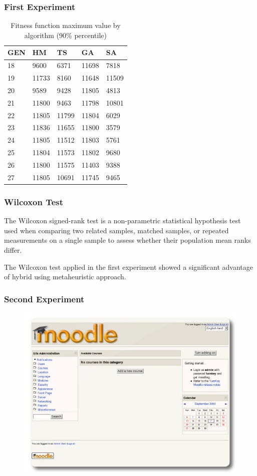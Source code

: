\documentclass{beamer}
\begin{document}
\begin{frame}[allowframebreaks]
\frametitle{First Experiment}
\begin{table}[h]
\centering
\caption{Fitness function maximum value by algorithm (90\% percentile)}
\label{tab:averagefirst}
\begin{tabular}{|l|l|l|l|l|}
\hline
GEN & HM & TS  & GA    & SA    \\ \hline
18         & 9600  & 6371          & 11698 & 7818  \\ \hline
19         & 11733 & 8160          & 11648 & 11509 \\ \hline
20         & 9589  & 9428          & 11805 & 4813  \\ \hline
21         & 11800 & 9463          & 11798 & 10801 \\ \hline
22         & 11805 & 11799         & 11804 & 6029  \\ \hline
23         & 11836 & 11655         & 11800 & 3579  \\ \hline
24         & 11805 & 11512         & 11803 & 5761  \\ \hline
25         & 11804 & 11573         & 11802 & 9680  \\ \hline
26         & 11800 & 11575         & 11403 & 9388  \\ \hline
27         & 11805 & 10691         & 11745 & 9465  \\ \hline
\end{tabular}
\end{table}
\end{frame}


\begin{frame}
\frametitle{Wilcoxon Test}
The Wilcoxon signed-rank test is a non-parametric statistical hypothesis test used when comparing two related samples, matched samples, or repeated measurements on a single sample to assess whether their population mean ranks differ.

The Wilcoxon test applied in the first experiment showed a significant advantage of hybrid using metaheuristic approach.


\end{frame}

\begin{frame}
\frametitle{Second Experiment}
\begin{figure}[H]
\centering
\includegraphics[width=0.8\linewidth]{moodle.jpg}
\end{figure}
\end{frame}
\end{document}
